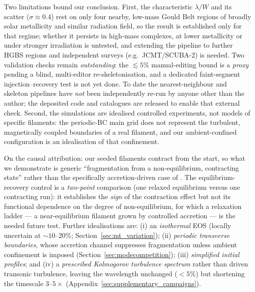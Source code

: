 \documentclass[usenatbib,twoside,twocolumn]{mnras}
\begin{document}
Two limitations bound our conclusion. First, the characteristic $\lambda/W$ and its scatter ($\sigma\approx0.4$) rest on only four nearby, low-mass Gould Belt regions of broadly solar metallicity and similar radiation field, so the result is established only for that regime; whether it persists in high-mass complexes, at lower metallicity or under stronger irradiation is untested, and extending the pipeline to further HGBS regions and independent surveys (e.g.\ JCMT/SCUBA-2) is needed. Two validation checks remain \emph{outstanding}: the $\lesssim5\%$ manual-editing bound is a \emph{proxy} pending a blind, multi-editor re-skeletonisation, and a dedicated faint-segment injection--recovery test is not yet done. To date the nearest-neighbour and skeleton pipelines have \emph{not} been independently re-run by anyone other than the author; the deposited code and catalogues are released to enable that external check. Second, the simulations are idealised controlled experiments, not models of specific filaments: the periodic-BC main grid does not represent the turbulent, magnetically coupled boundaries of a real filament, and our ambient-confined configuration is an idealisation of that confinement.

On the causal attribution: our seeded filaments contract from the start, so what we demonstrate is generic ``fragmentation from a non-equilibrium, contracting state'' rather than the specifically accretion-driven case of \citet{Clarke2016,Clarke2017}. The equilibrium-recovery control is a \emph{two-point} comparison (one relaxed equilibrium versus one contracting run): it establishes the \emph{sign} of the contraction effect but not its functional dependence on the degree of non-equilibrium, for which a relaxation ladder --- a near-equilibrium filament grown by controlled accretion --- is the needed future test. Further idealisations are: (i) an \emph{isothermal} EOS (locally uncertain at $\sim10$--$20\%$; Section~\ref{sec:mt_variation}); (ii) \emph{periodic transverse boundaries}, whose accretion channel suppresses fragmentation unless ambient confinement is imposed (Section~\ref{sec:modecompetition}); (iii) \emph{simplified initial profiles}; and (iv) a \emph{prescribed Kolmogorov turbulence spectrum} rather than driven transonic turbulence, leaving the wavelength unchanged ($<5\%$) but shortening the timescale $3$--$5\times$ (Appendix~\ref{sec:supplementary_campaigns}).
\end{document}
